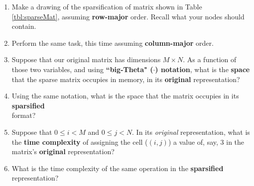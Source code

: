 \documentclass[letterpaper,12pt]{article}
\begin{document}
\begin{enumerate}[label=(\roman*)]
	\item Make a drawing of the sparsification of matrix shown in Table \ref{tbl:sparseMat}, assuming {\bf row-major} order. Recall what your nodes should contain.  \vspace{-.1in}
	
	
	
	\answerspace{2in}
	
	\item Perform the same task, this time assuming {\bf column-major} order. \vspace{-.1in}
	

	\answerspace{2in}
	
	\item Suppose that our original matrix has dimensions $M \times N$. As a function of those two variables, and using \textbf{``big-Theta" (\bigtheta}{$\cdot$}\textbf{) notation}, what is the {\bf space} that the sparse matrix occupies in memory, in its \textbf{original} representation?  \myline{1in} 
	
	\item Using the same notation, what is the space that the matrix occupies in its \textbf{sparsified} \\ format? \myline{1in}
	\item Suppose that $0 \leq i < M$ and $0 \leq j < N$. In its \textit{original} representation, what is the \textbf{time complexity} of assigning the cell ($(i, j)$) a value of, say, $3$ in the matrix's {\bf original} representation? \myline{1in}
	\item What is the time complexity of the same operation in the {\bf sparsified} representation? \myline{1in}
\end{enumerate}
\pagebreak
\end{document}
